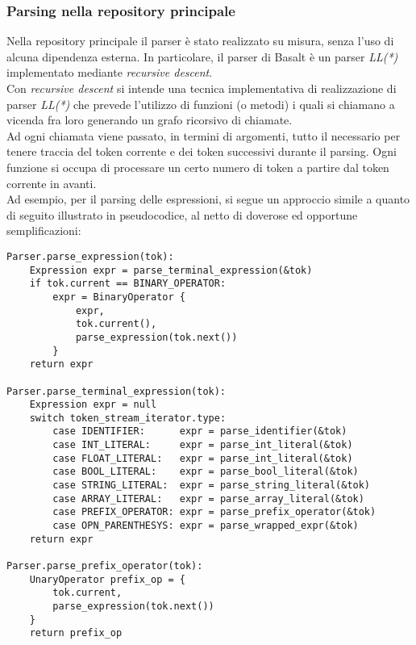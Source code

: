 \subsubsection{Parsing nella repository principale}
Nella repository principale il parser è
stato realizzato su misura, senza l'uso di alcuna
dipendenza esterna. In particolare, il parser di Basalt è un 
parser \textit{LL(*)} implementato 
mediante \textit{recursive descent}. \\

Con \textit{recursive descent} si intende una tecnica implementativa 
di realizzazione di parser \textit{LL(*)} che prevede l'utilizzo di 
funzioni (o metodi) i quali si chiamano a vicenda fra loro generando 
un grafo ricorsivo di chiamate. \\

Ad ogni chiamata viene passato, in termini di argomenti, tutto il necessario 
per tenere traccia del token corrente e dei token successivi durante il 
parsing. Ogni funzione si occupa di processare un certo numero di 
token a partire dal token corrente in avanti. \\

Ad esempio, per il parsing delle espressioni, si segue un approccio 
simile a quanto di seguito illustrato in pseudocodice, al netto di 
doverose ed opportune semplificazioni:


\vspace{0.5cm}
\begin{lstlisting}[frame=single]
Parser.parse_expression(tok):
    Expression expr = parse_terminal_expression(&tok)
    if tok.current == BINARY_OPERATOR:
        expr = BinaryOperator {
            expr,
            tok.current(),
            parse_expression(tok.next())
        }
    return expr

Parser.parse_terminal_expression(tok):
    Expression expr = null
    switch token_stream_iterator.type:
        case IDENTIFIER:      expr = parse_identifier(&tok)
        case INT_LITERAL:     expr = parse_int_literal(&tok)
        case FLOAT_LITERAL:   expr = parse_int_literal(&tok)
        case BOOL_LITERAL:    expr = parse_bool_literal(&tok)
        case STRING_LITERAL:  expr = parse_string_literal(&tok)
        case ARRAY_LITERAL:   expr = parse_array_literal(&tok)
        case PREFIX_OPERATOR: expr = parse_prefix_operator(&tok)
        case OPN_PARENTHESYS: expr = parse_wrapped_expr(&tok)
    return expr

Parser.parse_prefix_operator(tok):
    UnaryOperator prefix_op = { 
        tok.current, 
        parse_expression(tok.next()) 
    }
    return prefix_op

\end{lstlisting}
\vspace{0.5cm}